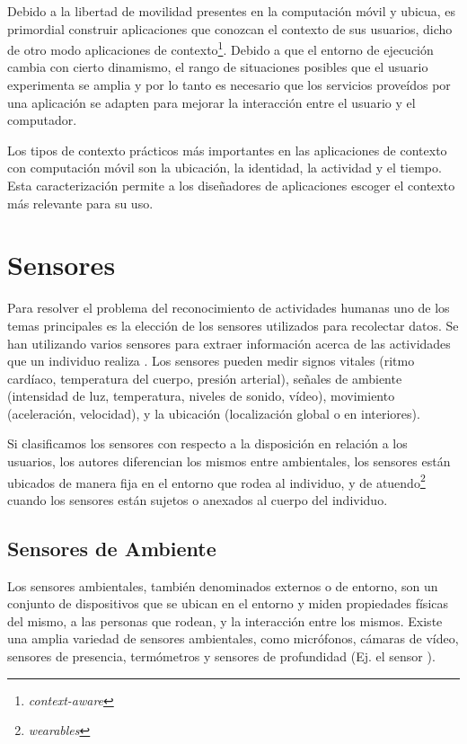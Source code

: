 Debido a la libertad de movilidad presentes en la computación móvil
y ubicua, es primordial construir aplicaciones que conozcan el contexto
de sus usuarios, dicho de otro modo aplicaciones de contexto\footnote{\emph{context-aware}}.
Debido a que el entorno de ejecución cambia con cierto dinamismo,
el rango de situaciones posibles que el usuario experimenta se amplia
y por lo tanto es necesario que los servicios proveídos por una aplicación
se adapten para mejorar la interacción entre el usuario y el computador.

Los tipos de contexto prácticos más importantes en las aplicaciones
de contexto con computación móvil son la ubicación, la identidad,
la actividad y el tiempo. Esta caracterización permite a los diseñadores
de aplicaciones escoger el contexto más relevante para su uso.

\section{Sensores}

\label{sec23:sensores} Para resolver el problema del reconocimiento
de actividades humanas uno de los temas principales es la elección
de los sensores utilizados para recolectar datos. Se han utilizando
varios sensores para extraer información acerca de las actividades
que un individuo realiza \cite{Chen2012,LaraLabrador2012}. Los sensores
pueden medir signos vitales (ritmo cardíaco, temperatura del cuerpo,
presión arterial), señales de ambiente (intensidad de luz, temperatura,
niveles de sonido, vídeo), movimiento (aceleración, velocidad), y
la ubicación (localización global o en interiores). 

Si clasificamos los sensores con respecto a la disposición en relación
a los usuarios, los autores \cite{ReyesOrtiz2015,LaraLabrador2013}
diferencian los mismos entre ambientales, los sensores están ubicados
de manera fija en el entorno que rodea al individuo, y de atuendo\footnote{\emph{wearables}}
cuando los sensores están sujetos o anexados al cuerpo del individuo.

\subsection{Sensores de Ambiente}

Los sensores ambientales, también denominados externos o de entorno,
son un conjunto de dispositivos que se ubican en el entorno y miden
propiedades físicas del mismo, a las personas que rodean, y la interacción
entre los mismos. Existe una amplia variedad de sensores ambientales,
como micrófonos, cámaras de vídeo, sensores de presencia, termómetros
y sensores de profundidad (Ej. el sensor ). 

